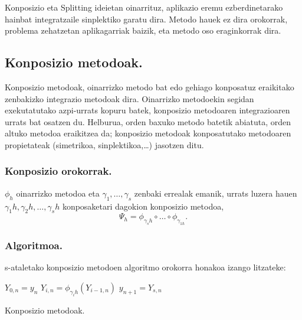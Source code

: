 Konposizio eta Splitting ideietan oinarrituz, aplikazio eremu ezberdinetarako hainbat integratzaile sinplektiko garatu dira. Metodo hauek ez dira orokorrak, problema zehatzetan aplikagarriak baizik, eta metodo oso eraginkorrak dira.

\subsection{Konposizio metodoak.}

Konposizio metodoak, oinarrizko metodo bat edo gehiago konposatuz eraikitako zenbakizko integrazio metodoak dira.  Oinarrizko metodoekin segidan exekutatutako azpi-urrats kopuru batek, konposizio metodoaren integrazioaren urrats bat osatzen du. Helburua, orden baxuko metodo batetik abiatuta, orden altuko metodoa eraikitzea da; konposizio metodoak  konposatutako metodoaren propietateak (simetrikoa, sinplektikoa,\dots) jasotzen ditu. 

\subsubsection*{Konposizio orokorrak.}
$\phi_h$ oinarrizko metodoa eta $\gamma_1,\dots,\gamma_s$ zenbaki errealak emanik, urrats luzera hauen $\gamma_1 h,\gamma_2 h,\dots,\gamma_s h$ konposaketari dagokion konposizio metodoa,
\begin{equation}
\Psi_h=\phi_{\gamma_s h} \circ \dots \circ \phi_{\gamma_{1 h}}.
\end{equation}

\subsubsection*{Algoritmoa.}
s-ataletako konposizio metodoen algoritmo orokorra honakoa izango litzateke:

\begin{algorithm}[H]
 \BlankLine
  {
   \BlankLine
    $Y_{0,n}=y_{n} $\;
    \BlankLine
   {
    \BlankLine 
    $Y_{i,n}=\phi_{\gamma_i h}(Y_{i-1,n})$\;
   }
   \BlankLine
    $y_{n+1}=Y_{s,n}$\;
   \BlankLine
 }
 \caption{Konposizio metodoak.}
\end{algorithm}
 
